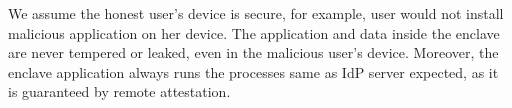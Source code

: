We assume the honest user's device is secure, for example, user would not install malicious application on her device.
The application and data inside the enclave are never tempered or leaked, even in the malicious user's device.
Moreover, the enclave application always runs the processes same as IdP server expected, as it is guaranteed by remote attestation.



